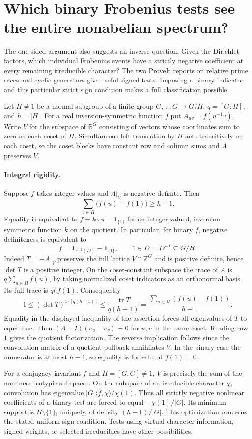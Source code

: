\section{Which binary Frobenius tests see the entire nonabelian spectrum?}
The one-sided argument also suggests an inverse question. Given the Dirichlet factors, which individual Frobenius events have a strictly negative coefficient at every remaining irreducible character? The two ProveIt reports on relative prime races and cyclic generators give useful signed tests. Imposing a binary indicator and this particular strict sign condition makes a full classification possible.

Let $H\ne1$ be a normal subgroup of a finite group $G$, $\pi:G\to G/H$, $q=[G:H]$, and $h=|H|$. For a real inversion-symmetric function $f$ put $A_{uv}=f(u^{-1}v)$. Write $V$ for the subspace of $\mathbb R^G$ consisting of vectors whose coordinates sum to zero on each coset of $H$. Simultaneous left translation by $H$ acts transitively on each coset, so the coset blocks have constant row and column sums and $A$ preserves $V$.

\paragraph{Integral rigidity.}
Suppose $f$ takes integer values and $A|_V$ is negative definite. Then
\[
 \sum_{u\in H}\bigl(f(u)-f(1)\bigr)\ge h-1.
\]
Equality is equivalent to $f=k\circ\pi-\mathbf1_{\{1\}}$ for an integer-valued, inversion-symmetric function $k$ on the quotient. In particular, for binary $f$, negative definiteness is equivalent to
\[
 f=\mathbf1_{\pi^{-1}(D)}-\mathbf1_{\{1\}},
 \qquad 1\in D=D^{-1}\subseteq G/H.
\]
Indeed $T=-A|_V$ preserves the full lattice $V\cap\mathbb Z^G$ and is positive definite, hence $\det T$ is a positive integer. On the coset-constant subspace the trace of $A$ is $q\sum_{u\in H}f(u)$, by taking normalized coset indicators as an orthonormal basis. Its full trace is $qh f(1)$. Consequently
\[
 1\le (\det T)^{1/[q(h-1)]}\le
 \frac{\operatorname{tr}T}{q(h-1)}
 =\frac{\sum_{u\in H}(f(u)-f(1))}{h-1}.
\]
Equality in the displayed inequality of the assertion forces all eigenvalues of $T$ to equal one. Then $(A+I)(e_u-e_v)=0$ for $u,v$ in the same coset. Reading row $1$ gives the quotient factorization. The reverse implication follows since the convolution matrix of a quotient pullback annihilates $V$. In the binary case the numerator is at most $h-1$, so equality is forced and $f(1)=0$.

For a conjugacy-invariant $f$ and $H=[G,G]\ne1$, $V$ is precisely the sum of the nonlinear isotypic subspaces. On the subspace of an irreducible character $\chi$, convolution has eigenvalue $|G|\langle f,\chi\rangle/\chi(1)$. Thus all strictly negative nonlinear coefficients of a binary test are forced to equal $-\chi(1)/|G|$. Its minimum support is $H\setminus\{1\}$, uniquely, of density $(h-1)/|G|$. This optimization concerns the stated uniform sign condition. Tests using virtual-character information, signed weights, or selected irreducibles have other possibilities.

